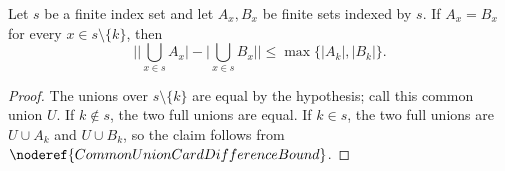 \begin{helper}
Let \(s\) be a finite index set and let \(A_x,B_x\) be finite sets indexed by
\(s\). If \(A_x=B_x\) for every \(x\in s\setminus\{k\}\), then
\[
\bigl|\bigl|\bigcup_{x\in s} A_x\bigr|-\bigl|\bigcup_{x\in s} B_x\bigr|\bigr|
\le \max\{|A_k|,|B_k|\}.
\]
\end{helper}
\begin{proof}
The unions over \(s\setminus\{k\}\) are equal by the hypothesis; call this
common union \(U\). If \(k\notin s\), the two full unions are equal. If
\(k\in s\), the two full unions are \(U\cup A_k\) and \(U\cup B_k\), so the
claim follows from \(\noderef{CommonUnionCardDifferenceBound}\).
\end{proof}
